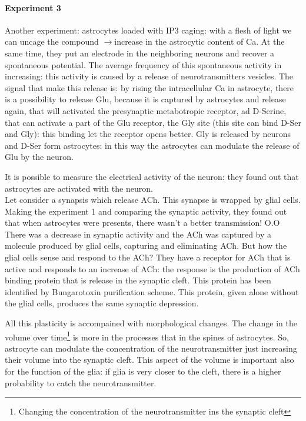 \documentclass[a4paper, 12pt]{book}
\newcommand{\lfreccia}{\ensuremath{\longrightarrow}}
\begin{document}
	\paragraph{Experiment 3}
Another experiment: astrocytes loaded with IP3 caging: with a flesh of light we can uncage the compound \lfreccia increase in the astrocytic content of Ca. At the same time, they put an electrode in the neighboring neurons and recover a spontaneous potential. The average frequency of this spontaneous activity in increasing: this activity is caused by a release of neurotransmitters vesicles. The signal that make this release is: by rising the intracellular Ca in astrocyte, there is a possibility to release Glu, because it is captured by astrocytes and release again, that will activated the presynaptic metabotropic receptor, ad D-Serine, that can activate a part of the Glu receptor, the Gly site (this site can bind D-Ser and Gly): this binding let the receptor opens better. Gly is released by neurons and D-Ser form astrocytes: in this way the astrocytes can modulate the release of Glu by the neuron.

It is possible to measure the electrical activity of the neuron: they found out that astrocytes are activated with the neuron.
\\

Let consider a synapsis which release ACh. This synapse is wrapped by glial cells. Making the experiment 1 and comparing the synaptic activity, they found out that when astrocytes were presents, there wasn't a better transmission! O.O There was a decrease in synaptic activity and the ACh was captured by a molecule produced by glial cells, capturing and eliminating ACh.  But how the glial cells sense and respond to the ACh? They have a receptor for ACh that is active and responds to an increase of ACh: the response is the production of ACh binding protein that is release in the synaptic cleft. This protein has been identified by Bungarotoxin purification scheme. This protein, given alone without the glial cells, produces the same synaptic depression. 

All this plasticity is accompained with morphological changes. The change in the volume over time\footnote{Changing the concentration of the neurotransmitter ins the synaptic cleft} is more in the processes that in the spines of astrocytes. So, astrocyte can modulate the concentration of the neurotransmitter just increasing their volume into the synaptic cleft. This aspect of the volume is important also for the function of the glia: if glia is very closer to the cleft, there is a higher probability to catch the neurotransmitter.
\end{document}

